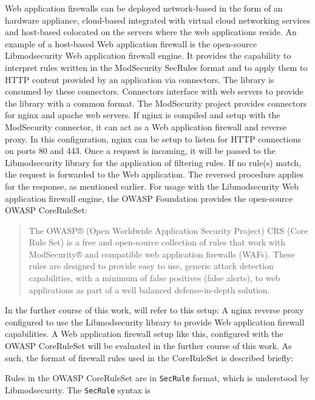 Web application firewalls can be deployed network-based in the form of an hardware appliance, cloud-based integrated with virtual cloud networking services and host-based colocated on the servers where the web applications reside. \cite{palo/waf}
An example of a host-based Web application firewall is the open-source Libmodsecurity Web application firewall engine.
It provides the capability to interpret rules written in the ModSecurity SecRules format and to apply them to HTTP content provided by an application via connectors.
The library is consumed by these connectors. Connectors interface with web servers to provide the library with a common format.
The ModSecurity project provides connectors for nginx and apache web servers.
If nginx is compiled and setup with the ModSecurity connector, it can act as a Web application firewall and reverse proxy. \cite{modsec/home, modsec/nginx}
In this configuration, nginx can be setup to listen for HTTP connections on ports 80 and 443.
Once a request is incoming, it will be passed to the Libmodsecurity library for the application of filtering rules.
If no rule(s) match, the request is forwarded to the Web application. The reversed procedure applies for the response, as mentioned earlier.
For usage with the Libmodsecurity Web application firewall engine, the OWASP Foundation provides the open-source OWASP CoreRuleSet:

\begin{quote}
	The OWASP® (Open Worldwide Application Security Project) CRS (Core Rule Set) is a free and open-source collection of rules that work with ModSecurity® and compatible web application firewalls (WAFs). These rules are designed to provide easy to use, generic attack detection capabilities, with a minimum of false positives (false alerts), to web applications as part of a well balanced defense-in-depth solution. \cite{OWASP/crshome}
\end{quote}

In the further course of this work,  will refer to this setup: A nginx reverse proxy configured to use the Libmodsecurity library to provide Web application firewall capabilities.
A Web application firewall setup like this, configured with the OWASP CoreRuleSet will be evaluated in the further course of this work. As such, the format of firewall rules used in the CoreRuleSet is described briefly:

Rules in the OWASP CoreRuleSet are in \verb|SecRule| format, which is understood by Libmodsecurity. The \verb|SecRule| syntax is 

